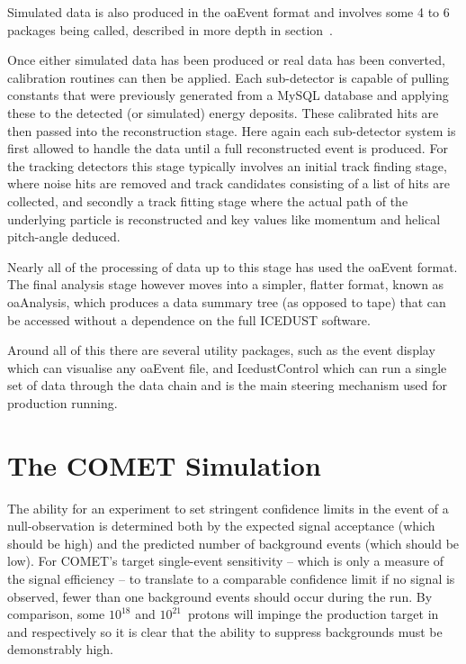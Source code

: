 Simulated data is also produced in the oaEvent format and involves some 4 to 6 packages being called, described in more depth in section~.

Once either simulated data has been produced or real data has been converted, calibration routines can then be applied.
Each sub-detector is capable of pulling constants that were previously generated from a MySQL database and applying these to the detected (or simulated) energy deposits.
These calibrated hits are then passed into the reconstruction stage.  
Here again each sub-detector system is first allowed to handle the data until a full reconstructed event is produced.
For the tracking detectors this stage typically involves an initial track finding stage, where noise hits are removed and track candidates consisting of a list of hits are collected, and secondly a track fitting stage where the actual path of the underlying particle is reconstructed and key values like momentum and helical pitch-angle deduced.

Nearly all of the processing of data up to this stage has used the oaEvent format.
The final analysis stage however moves into a simpler, flatter format, known as oaAnalysis, which produces a data summary tree (as opposed to tape) that can be accessed without a dependence on the full ICEDUST software.

Around all of this there are several utility packages, such as the event display which can visualise any oaEvent file, and IcedustControl which can run a single set of data through the data chain and is the main steering mechanism used for production running.

\section{The COMET Simulation}
\FigSimulationOverview
The ability for an experiment to set stringent confidence limits in the event of a null-observation is determined both by the expected signal acceptance (which should be high) and the predicted number of background events (which should be low).
For COMET's target single-event sensitivity -- which is only a measure of the signal efficiency -- to translate to a comparable confidence limit if no signal is observed, fewer than one background events should occur during the run.
By comparison, some $10^{18}$ and $10^{21}$~protons  will impinge the production target in \phaseI and \phaseII respectively so it is clear that the ability to suppress backgrounds must be demonstrably high.

